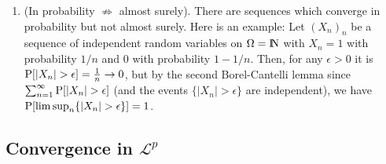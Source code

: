 \documentclass[a4paper,10pt]{scrbook}
\begin{document}
\begin{enumerate}
 \item (In probability $\not\Rightarrow$ almost surely). 
       There are sequences which converge in probability but not almost surely. Here is an example:
              Let $(X_n)_n$ be a sequence of independent random variables on $\Omega=\N$
              with $X_n=1$ with probability $1/n$ and $0$ with probability $1-1/n$.
              Then, for any $\epsilon>0$ it is $\prob[|X_n|>\epsilon]=\tfrac{1}{n}\to 0$,
              but by the second Borel-Cantelli lemma since $\sum_{n=1}^{\infty}\prob[|X_n|>\epsilon]$
              (and the events $\{|X_n|>\epsilon\}$ are independent), we have $\prob[\limsup_n \{|X_n|>\epsilon\}]=1$.
       
\end{enumerate} 
 
\subsection{Convergence in $\mathcal{L}^p$}
\end{document}
